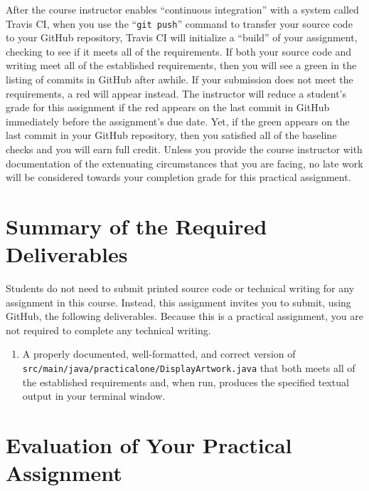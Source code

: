 \documentclass[11pt]{article}
\newcommand{\mainprogramsource}{\lstinline{src/main/java/practicalone/DisplayArtwork.java}}
\newcommand{\gitpush}{\command{git push}}
\newcommand{\command}[1]{``\lstinline{#1}''}
\newcommand{\step}[1]{``{#1}''}
\newcommand{\checkmark}{\ding{51}}
\newcommand{\naughtmark}{\ding{55}}
\begin{document}
After the course instructor enables \step{continuous integration} with a system
called Travis CI, when you use the \gitpush{} command to transfer your source
code to your GitHub repository, Travis CI will initialize a \step{build} of your
assignment, checking to see if it meets all of the requirements. If both your
source code and writing meet all of the established requirements, then you will
see a green \checkmark{} in the listing of commits in GitHub after awhile. If
your submission does not meet the requirements, a red \naughtmark{} will appear
instead. The instructor will reduce a student's grade for this assignment if the
red \naughtmark{} appears on the last commit in GitHub immediately before the
assignment's due date. Yet, if the green \checkmark{} appears on the last commit
in your GitHub repository, then you satisfied all of the baseline checks and you
will earn full credit. Unless you provide the course instructor with
documentation of the extenuating circumstances that you are facing, no late work
will be considered towards your completion grade for this practical assignment.

\section*{Summary of the Required Deliverables}

\noindent Students do not need to submit printed source code or technical
writing for any assignment in this course. Instead, this assignment invites you
to submit, using GitHub, the following deliverables. Because this is a practical
assignment, you are not required to complete any technical writing.

\vspace*{-.1in}
\begin{enumerate}

\setlength{\itemsep}{0in}

\item A properly documented, well-formatted, and correct version of
  \mainprogramsource{} that both meets all of the established requirements and,
  when run, produces the specified textual output in your terminal window.

\end{enumerate}
\vspace*{-.15in}

\section*{Evaluation of Your Practical Assignment}
\end{document}
